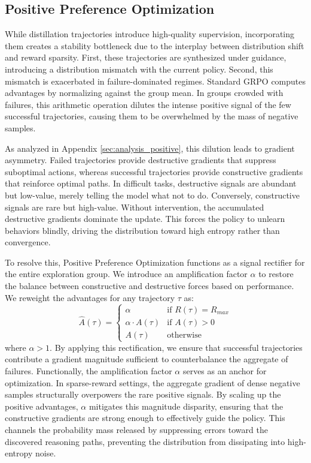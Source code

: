 \documentclass[11pt]{article}
\begin{document}
\subsection{Positive Preference Optimization}
\label{sec:positive_preference}
While distillation trajectories introduce high-quality supervision, incorporating them creates a stability bottleneck due to the interplay between distribution shift and reward sparsity. First, these trajectories are synthesized under guidance, introducing a distribution mismatch with the current policy. Second, this mismatch is exacerbated in failure-dominated regimes. Standard GRPO computes advantages by normalizing against the group mean. In groups crowded with failures, this arithmetic operation dilutes the intense positive signal of the few successful trajectories, causing them to be overwhelmed by the mass of negative samples.

As analyzed in Appendix \ref{sec:analysis_positive}, this dilution leads to gradient asymmetry. Failed trajectories provide destructive gradients that suppress suboptimal actions, whereas successful trajectories provide constructive gradients that reinforce optimal paths. In difficult tasks, destructive signals are abundant but low-value, merely telling the model what not to do. Conversely, constructive signals are rare but high-value. Without intervention, the accumulated destructive gradients dominate the update. This forces the policy to unlearn behaviors blindly, driving the distribution toward high entropy rather than convergence.

To resolve this, Positive Preference Optimization functions as a signal rectifier for the entire exploration group. We introduce an amplification factor $\alpha$ to restore the balance between constructive and destructive forces based on performance. We reweight the advantages for any trajectory $\tau$ as:
\begin{equation}
\label{eq:reweight_advantage}
    \hat{A}(\tau) = \begin{cases}
    \alpha & \text{if } R(\tau) = R_{max} \\
    \alpha \cdot A(\tau) & \text{if } A(\tau) > 0 \\
    A(\tau) & \text{otherwise}
    \end{cases}
\end{equation}
where $\alpha > 1$. By applying this rectification, we ensure that successful trajectories contribute a gradient magnitude sufficient to counterbalance the aggregate of failures. Functionally, the amplification factor $\alpha$ serves as an anchor for optimization. In sparse-reward settings, the aggregate gradient of dense negative samples structurally overpowers the rare positive signals. By scaling up the positive advantages, $\alpha$ mitigates this magnitude disparity, ensuring that the constructive gradients are strong enough to effectively guide the policy. This channels the probability mass released by suppressing errors toward the discovered reasoning paths, preventing the distribution from dissipating into high-entropy noise.
\end{document}
